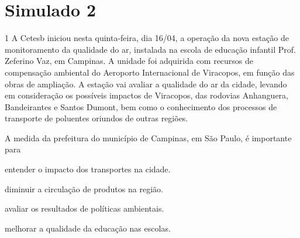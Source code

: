 
\chapter{Simulado 2 }

\num{1} A Cetesb iniciou nesta quinta-feira, dia 16/04, a operação da nova
estação de monitoramento da qualidade do ar, instalada na escola de
educação infantil Prof. Zeferino Vaz, em Campinas. A unidade foi
adquirida com recursos de compensação ambiental do Aeroporto
Internacional de Viracopos, em função das obras de ampliação. A estação
vai avaliar a qualidade do ar da cidade, levando em consideração os
possíveis impactos de Viracopos, das rodovias Anhanguera, Bandeirantes e
Santos Dumont, bem como o conhecimento dos processos de transporte de
poluentes oriundos de outras regiões.


A medida da prefeitura do município de Campinas, em São Paulo, é
importante para

\begin{escolha}
\item entender o impacto dos transportes na cidade.

\item diminuir a circulação de produtos na região.

\item avaliar os resultados de políticas ambientais.

\item melhorar a qualidade da educação nas escolas.
\end{escolha}

